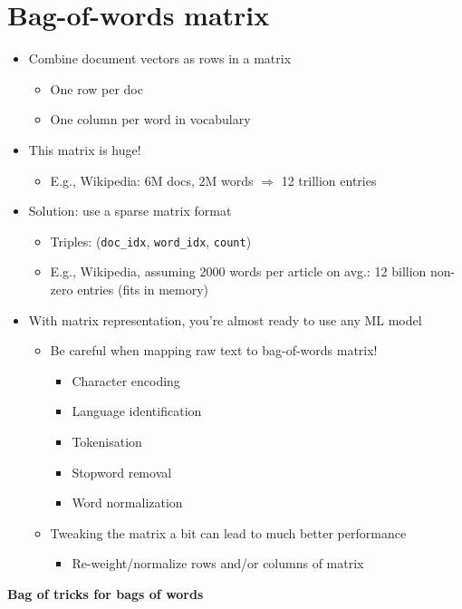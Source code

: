 \documentclass[11pt]{article}
\begin{document}
\section*{Bag-of-words matrix}
\begin{itemize}
	\item Combine document vectors as rows in a matrix
		\begin{itemize}
			\item One row per doc
			\item One column per word in vocabulary
		\end{itemize}
	\item This matrix is huge!
		\begin{itemize}
			\item E.g., Wikipedia: 6M docs, 2M words $\Rightarrow$ 12 trillion entries
		\end{itemize}
	\item Solution: use a sparse matrix format
		\begin{itemize}
			\item Triples: (\verb|doc_idx|, \verb|word_idx|, \verb|count|)
			\item E.g., Wikipedia, assuming 2000 words per article on avg.: 12 billion non-zero entries (fits in memory)
		\end{itemize}
	\item With matrix representation, you're almost ready to use any ML model
		\begin{itemize}
			\item Be careful when mapping raw text to bag-of-words matrix!
				\begin{itemize}
					\item Character encoding
					\item Language identification
					\item Tokenisation
					\item Stopword removal
					\item Word normalization
				\end{itemize}
			\item Tweaking the matrix a bit can lead to much better performance
				\begin{itemize}
					\item Re-weight/normalize rows and/or columns of matrix
				\end{itemize}
		\end{itemize}
\end{itemize}

\vspace{0.5cm}
\newpage
\begin{center}
  {\LARGE \textbf{Bag of tricks for bags of words}}
\end{center}
\vspace{0.5cm}
\end{document}
